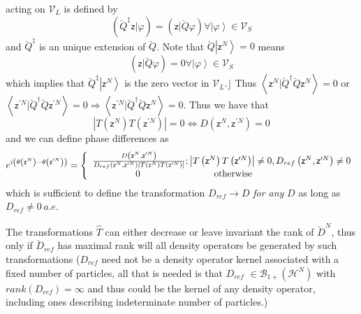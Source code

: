\documentclass[aps,preprint]{revtex4}
\begin{document}
acting on $\mathcal{V}_{L}$ is defined by 
\begin{equation}
\left( \breve{Q}^{\ddagger }\mathsf{z}|\varphi \right) =\left( \mathsf{z}|%
\breve{Q}\varphi \right) \forall \left\vert \varphi \right\rangle \in 
\mathcal{V}_{S}
\end{equation}%
and $\breve{Q}^{\ddagger }$ is an unique extension of $\breve{Q}$. Note that 
$\breve{Q}\left\vert \mathsf{z}^{N}\right\rangle =0$ means 
\begin{equation}
\left( \mathsf{z}|\breve{Q}\varphi \right) =0\forall \left\vert \varphi
\right\rangle \in \mathcal{V}_{S}
\end{equation}%
which implies that $\breve{Q}^{\ddagger }\left\vert \mathsf{z}%
^{N}\right\rangle $ is the zero vector in $\mathcal{V}_{L}$.$\rfloor $ Thus $%
\left\langle \mathsf{z}^{N}|\breve{Q}^{\dagger }\breve{Q}\mathsf{z}%
^{N}\right\rangle =0$ or $\left\langle \mathsf{z}^{\prime N}|\breve{Q}%
^{\dagger }\breve{Q}\mathsf{z}^{\prime N}\right\rangle =0\Rightarrow
\left\langle \mathsf{z}^{\prime N}|\breve{Q}^{\dagger }\breve{Q}\mathsf{z}%
^{N}\right\rangle =0$. Thus we have that 
\begin{equation}
\left\vert T\left( \mathsf{z}^{N}\right) T\left( \mathsf{z}^{\prime
N}\right) \right\vert =0\Longleftrightarrow D\left( \mathsf{z}^{N},\mathsf{z}%
^{\prime N}\right) =0
\end{equation}%
and we can define phase differences as 
\begin{equation}
e^{i\left( \theta \left( \mathsf{z}^{N}\right) -\theta \left( \mathsf{z}%
^{\prime N}\right) \right) }=\left\{ 
\begin{array}{c}
\frac{D\left( \mathsf{z}^{N},\mathsf{z}^{\prime N}\right) }{D_{ref}\left( 
\mathsf{z}^{N},\mathsf{z}^{\prime N}\right) \left\vert T\left( \mathsf{z}%
^{N}\right) T\left( \mathsf{z}^{\prime N}\right) \right\vert };\left\vert
T\left( \mathsf{z}^{N}\right) T\left( \mathsf{z}^{\prime N}\right)
\right\vert \neq 0,D_{ref}\left( \mathsf{z}^{N},\mathsf{z}^{\prime N}\right)
\neq 0 \\ 
\text{\qquad \qquad }0\qquad \text{\qquad \qquad \qquad otherwise\qquad
\qquad \qquad \qquad \qquad }%
\end{array}%
\right.
\end{equation}%
which is sufficient to define the transformation $D_{ref}\rightarrow D$ 
\emph{for any }$D$ as long as $D_{ref}\neq 0\,a.e.$

The transformations $\hat{T}$ can either decrease or leave invariant the
rank of $\breve{D}^{N}$, thus only if $\breve{D}_{ref}$ has maximal rank
will all density operators be generated by such transformations ($D_{ref}$
need not be a density operator kernel associated with a fixed number of
particles, all that is needed is that $D_{ref}$ $\in \mathcal{B}_{1+}\left( 
\mathcal{H}^{N}\right) $ with $rank\left( D_{ref}\right) =\infty $ and thus
could be the kernel of any density operator, including ones describing
indeterminate number of particles.)
\end{document}
